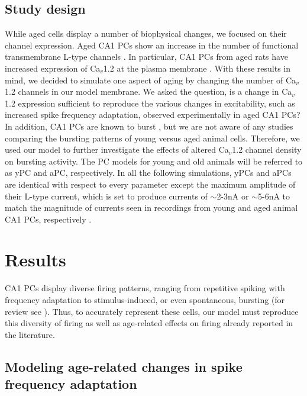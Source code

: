 \documentclass[12pt]{article}
\begin{document}
\subsection{Study design}
While aged cells display a number of biophysical changes, we focused on their {\Ca} channel expression. Aged CA1 PCs show an increase in the number of functional transmembrane L-type {\Ca} channels  \citep{chen2000expression,herman1998up,thibault1996increase,veng2002regionally,veng2003age}. In particular, CA1 PCs from aged rats have increased expression of Ca$_v$1.2 at the plasma membrane \citep{nunez2014surface}. With these results in mind, we decided to simulate one aspect of aging by changing the number of Ca$_v$1.2 channels in our model membrane. We asked the question, is a change in Ca$_v$1.2 expression sufficient to reproduce the various changes in excitability, such as increased spike frequency adaptation, observed experimentally in aged CA1 PCs? In addition, CA1 PCs are known to burst \citep{mckiernan2017ca1}, but we are not aware of any studies comparing the bursting patterns of young versus aged animal cells. Therefore, we used our model to further investigate the effects of altered Ca$_v$1.2 channel density on bursting activity. The PC models for young and old animals will be referred to as yPC and aPC, respectively. In all the following simulations, yPCs and aPCs are identical with respect to every parameter except the maximum amplitude of their L-type {\Ca} current, which is set to produce currents of $\sim$2-3nA or $\sim$5-6nA to match the magnitude of currents seen in recordings from young and aged animal CA1 PCs, respectively \cite{campbell1996aging}. 

\section{Results}
CA1 PCs display diverse firing patterns, ranging from repetitive spiking with frequency adaptation to stimulus-induced, or even spontaneous, bursting (for review see \cite{mckiernan2017ca1}). Thus, to accurately represent these cells, our model must reproduce this diversity of firing as well as age-related effects on firing already reported in the literature.  

\subsection{Modeling age-related changes in spike frequency adaptation}
\label{sec:adaptation}
\end{document}
